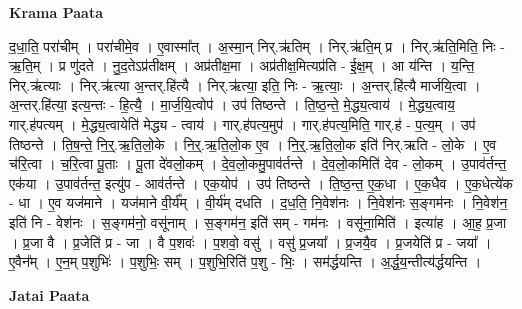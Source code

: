 \documentclass[17pt]{extarticle}
\begin{document}
\textbf{Krama Paata} \newline

द॒धा॒ति॒ परा॑चीम् । परा॑चीमे॒व । ए॒वास्मा᳚त् । अ॒स्मा॒न् निर्.ऋ॑तिम् । निर्.ऋ॑ति॒म् प्र । निर्.ऋ॑ति॒मिति॒ निः - ऋ॒ति॒म् । प्र णु॑दते । नु॒द॒तेऽप्र॑तीक्षम् । अप्र॑तीक्ष॒मा । अप्र॑तीक्ष॒मित्यप्र॑ति - 
ई॒क्ष॒म् । आ य॑न्ति । य॒न्ति॒ निर्.ऋ॑त्याः । निर्.ऋ॑त्या अ॒न्तर्.हि॑त्यै । निर्.ऋ॑त्या॒ इति॒ निः - ऋ॒त्याः॒ । अ॒न्तर्.हि॑त्यै मार्जयि॒त्वा । अ॒न्तर्.हि॑त्या॒ इत्य॒न्तः - हि॒त्यै॒ । मा॒र्ज॒यि॒त्वोप॑ । उप॑ तिष्ठन्ते । ति॒ष्ठ॒न्ते॒ मे॒द्ध्य॒त्वाय॑ । मे॒द्ध्य॒त्वाय॒ गार्.ह॑पत्यम् । मे॒द्ध्य॒त्वायेति॑ मेद्ध्य - त्वाय॑ । गार्.ह॑पत्य॒मुप॑ । गार्.ह॑पत्य॒मिति॒ गार्.ह॑ - प॒त्य॒म् । उप॑ तिष्ठन्ते । ति॒ष॒न्ते॒ नि॒र्॒.ऋ॒ति॒लो॒के । नि॒र्॒.ऋ॒ति॒लो॒क ए॒व । नि॒र्॒.ऋ॒ति॒लो॒क इति॑ निर्.ऋति - लो॒के । ए॒व च॑रि॒त्वा । च॒रि॒त्वा पू॒ताः । पू॒ता दे॑वलो॒कम् । दे॒व॒लो॒कमु॒पाव॑र्तन्ते । दे॒व॒लो॒कमिति॑ देव - लो॒कम् । उ॒पाव॑र्तन्त॒ एक॑या । उ॒पाव॑र्तन्त॒ इत्यु॑प - आव॑र्तन्ते । एक॒योप॑ । उप॑ तिष्ठन्ते । ति॒ष्ठ॒न्त॒ ए॒क॒धा । ए॒क॒धैव । ए॒क॒धेत्ये॑क - धा । ए॒व यज॑माने । यज॑माने वी॒र्य᳚म् । वी॒र्य॑म् दधति । द॒ध॒ति॒ नि॒वेश॑नः । नि॒वेश॑नः स॒ङ्गम॑नः । नि॒वेश॑न॒ इति॑ नि - वेश॑नः । स॒ङ्गम॑नो॒ वसू॑नाम् । स॒ङ्गम॑न॒ इति॑ सम् - गम॑नः । वसू॑ना॒मिति॑ । इत्या॑ह । आ॒ह॒ प्र॒जा । प्र॒जा वै । प्र॒जेति॑ प्र - जा । वै प॒शवः॑ । प॒शवो॒ वसु॑ । वसु॑ प्र॒जया᳚ । प्र॒जयै॒व । प्र॒जयेति॑ प्र - जया᳚ । ए॒वैन᳚म् । ए॒न॒म् प॒शुभिः॑ । प॒शुभिः॒ सम् । प॒शुभि॒रिति॑ प॒शु - भिः॒ । सम॑र्द्धयन्ति । अ॒र्द्ध॒य॒न्तीत्य॑र्द्धयन्ति । \newline

\textbf{Jatai Paata} \newline
\end{document}

